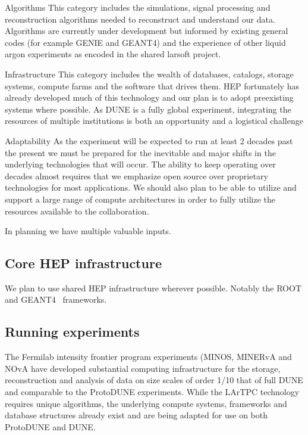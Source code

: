 \begin{description}
\item{Algorithms}
This category includes the simulations, signal processing and reconstruction algorithms needed to reconstruct and understand our data. Algorithms are currently under development but informed by existing general codes (for example GENIE and GEANT4) and the experience of other liquid argon experiments as encoded in the shared larsoft project.
\item{Infrastructure}
This category includes the wealth of databases, catalogs, storage systems, compute farms and the software that drives them.  HEP fortunately has already developed much of this technology and our plan is to adopt preexisting systems where possible.  As DUNE is a fully global experiment, integrating the resources of multiple institutions is both an opportunity and a logistical challenge
\item{Adaptability}
As the experiment will be expected to run at least 2 decades past the present we must be prepared for the inevitable and major shifts in the underlying technologies that will occur. The ability to keep operating over decades almost requires that we emphasize open source over proprietary technologies for most applications.  We should also plan to be able to utilize and support a large range of compute architectures in order to fully utilize the resources available to the collaboration.
 \end{description}

In planning we have multiple valuable inputs.

\subsection{Core HEP infrastructure}
We plan to use shared HEP infrastructure wherever possible.  Notably the ROOT\cite{root} and GEANT4~\cite{geant4,Allison:2006ve} frameworks. 

\subsection{Running experiments}\label{sw:IF-input}

The Fermilab intensity frontier program experiments (MINOS\cite{minos}, MINERvA\cite{minerva} and NOvA\cite{nova} have developed substantial computing infrastructure for the storage, reconstruction and analysis of data on size scales of order 1/10 that of full DUNE and comparable to the ProtoDUNE experiments. While the LArTPC technology requires unique algorithms, the underlying compute systems, frameworks and database structures already exist and are being adapted for use on both ProtoDUNE and DUNE.

